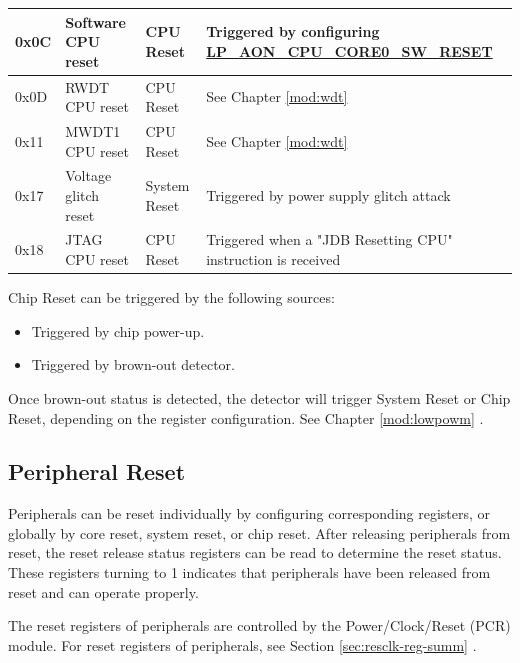 \documentclass[main\_\_EN.tex]{subfiles}
\begin{document}
\begin{table}[H]
\begin{threeparttable}
\begin{tabular}{ |l|m{3.5cm}|m{1.8cm}|m{9.2cm}| }
        \\\hline
         0x0C & Software CPU reset & CPU Reset & Triggered by configuring \hyperref[fielddesc:LPAONCPUCORE0SWRESET]{LP\_AON\_CPU\_CORE0\_SW\_RESET}\\
        \hline
        0x0D & RWDT CPU reset & CPU Reset & See Chapter \ref{mod:wdt} \textit{\nameref{mod:wdt}}
        \\\hline
        0x11 & MWDT1 CPU reset & CPU Reset & See Chapter \ref{mod:wdt} \textit{\nameref{mod:wdt}}
        \\\hline
        0x17 & Voltage glitch reset & System Reset & Triggered by power supply glitch attack
        \\\hline
        0x18 & JTAG CPU reset & CPU Reset & Triggered when a "JDB Resetting CPU" instruction is received
        \\\hline
\end{tabular}
        \begin{tablenotes}
            \item[1] Chip Reset can be triggered by the following sources:
                \begin{itemize}
                \item Triggered by chip power-up.
                \item Triggered by brown-out detector.
                \end{itemize}
            \item[2] Once brown-out status is detected, the detector will trigger System Reset or Chip Reset, depending on the register configuration. See Chapter  \ref{mod:lowpowm} \textit{}.
        \end{tablenotes}
     \end{threeparttable}
    \end{table}


\subsection{Peripheral Reset}

Peripherals can be reset individually by configuring corresponding registers, or globally by core reset, system reset, or chip reset. After releasing peripherals from reset, the reset release status registers can be read to determine the reset status. These registers turning to 1 indicates that peripherals have been released from reset and can operate properly.

The reset registers of \chipname{} peripherals are controlled by the Power/Clock/Reset (PCR) module. For reset registers of peripherals, see Section \ref{sec:resclk-reg-summ} \textit{}.
\end{document}
